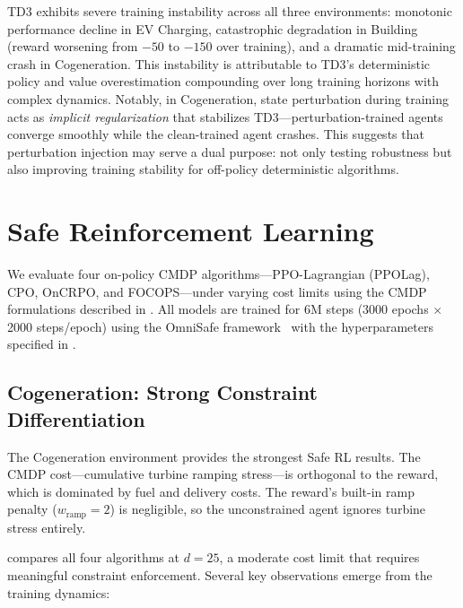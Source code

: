 \begin{finding}
\label{find:td3_instability}
TD3 exhibits severe training instability across all three environments: monotonic performance decline in EV Charging, catastrophic degradation in Building (reward worsening from $-50$ to $-150$ over training), and a dramatic mid-training crash in Cogeneration. This instability is attributable to TD3's deterministic policy and value overestimation compounding over long training horizons with complex dynamics. Notably, in Cogeneration, state perturbation during training acts as \emph{implicit regularization} that stabilizes TD3---perturbation-trained agents converge smoothly while the clean-trained agent crashes. This suggests that perturbation injection may serve a dual purpose: not only testing robustness but also improving training stability for off-policy deterministic algorithms.
\end{finding}

\section{Safe Reinforcement Learning}
\label{sec:results_saferl}

We evaluate four on-policy CMDP algorithms---PPO-Lagrangian (PPOLag), CPO, OnCRPO, and FOCOPS---under varying cost limits using the CMDP formulations described in . All models are trained for 6M steps (3000 epochs $\times$ 2000 steps/epoch) using the OmniSafe framework~\citep{ji2023omnisafe} with the hyperparameters specified in .

\subsection{Cogeneration: Strong Constraint Differentiation}
\label{sec:saferl_cogen}

The Cogeneration environment provides the strongest Safe RL results. The CMDP cost---cumulative turbine ramping stress---is orthogonal to the reward, which is dominated by fuel and delivery costs. The reward's built-in ramp penalty ($w_{\text{ramp}} = 2$) is negligible, so the unconstrained agent ignores turbine stress entirely.

 compares all four algorithms at $d = 25$, a moderate cost limit that requires meaningful constraint enforcement. Several key observations emerge from the training dynamics:

